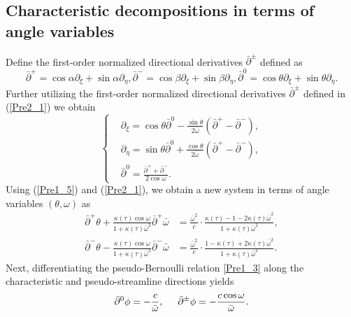 \documentclass[3p,11pt]{elsarticle}
\numberwithin{equation}{section}
\begin{document}
\subsection{Characteristic decompositions in terms of angle variables}
Define the first-order normalized directional derivatives $\bar{\partial}^\pm$ defined as
\begin{equation}\label{Pre2_1}
    \bar{\partial}^+ = \cos\alpha \partial_\xi+\sin\alpha \partial_\eta, \bar{\partial}^- = \cos\beta \partial_\xi+\sin\beta \partial_\eta, \bar{\partial}^0 = \cos\theta \partial_\xi+\sin\theta \partial_\eta.
\end{equation}
Further utilizing the first-order normalized directional derivatives $\bar{\partial}^\pm$ defined in (\ref{Pre2_1}) we obtain
\begin{equation}\label{Pre2_2}
    \begin{cases}
        &\partial_\xi = \cos\theta\bar{\partial}^0-\frac{\sin\theta}{2\bar\omega}(\bar{\partial}^+-\bar{\partial}^-),\\
        &\partial_\eta = \sin\theta\bar{\partial}^0+\frac{\cos\theta}{2\bar\omega}(\bar{\partial}^+-\bar{\partial}^-),\\
        &\bar\partial^0 = \frac{\bar\partial^++\bar\partial^-}{2\cos\omega}.
    \end{cases}
\end{equation} 
Using (\ref{Pre1_5}) and (\ref{Pre2_1}), we obtain a new system in terms of angle variables $(\theta,\omega)$ as
\begin{equation}\label{Pre2_3}
    \begin{split}
     \bar\partial^+\theta+\frac{\kappa(\tau)\cos\omega}{1+\kappa(\tau)\bar\omega^2} \bar\partial^+\bar\omega &=\frac{\bar\omega^2}{c}\cdot\frac{\kappa(\tau)-1-2\kappa(\tau)\bar\omega^2}{1+\kappa(\tau)\bar\omega^2},\\
        \bar\partial^-\theta-\frac{\kappa(\tau)\cos\omega}{1+\kappa(\tau)\bar\omega^2} \bar\partial^-\bar\omega &=\frac{\bar\omega^2}{c}\cdot\frac{1-\kappa(\tau)+2\kappa(\tau)\bar\omega^2}{1+\kappa(\tau)\bar\omega^2}.
    \end{split}
\end{equation}
Next, differentiating the pseudo-Bernoulli relation \eqref{Pre1_3} along the characteristic and pseudo-streamline directions yields
\begin{equation}\label{Pre2_4}
    \bar\partial^0\phi=-\frac{c}{\bar\omega}, \hspace{5mm}  \bar\partial^\pm\phi=-\frac{c\cos\omega}{\bar\omega}.
\end{equation}
\end{document}
